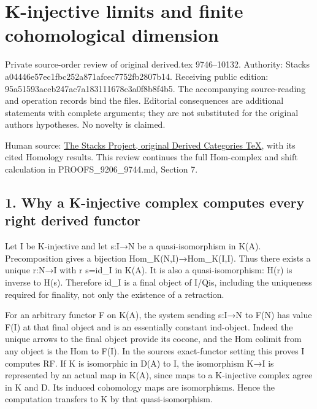 \section{K-injective limits and finite cohomological dimension}\label{proofs-9746-10132-k-injective-limits-and-finite-cohomological-dimension}

Private source-order review of original derived.tex 9746–\allowbreak{}10132. Authority:\allowbreak{} Stacks a04446e5\allowbreak{}7ec1fbc2\allowbreak{}52a871af\allowbreak{}cec7752f\allowbreak{}b2807b14. Receiving public edition:\allowbreak{} 95a51593\allowbreak{}aceb247a\allowbreak{}c7a18311\allowbreak{}1678c3a0\allowbreak{}f8b8f4b5. The accompanying source-reading and operation records bind the files. Editorial consequences are additional statements with complete arguments; they are not substituted for the original author\textquotesingle s hypotheses. No novelty is claimed.

Human source:\allowbreak{} \href{https://github.com/stacks/stacks-project/blob/a04446e57ec1fbc252a871afcec7752fb2807b14/derived.tex\#L9746}{The Stacks Project,\allowbreak{} original Derived Categories TeX},\allowbreak{} with its cited Homology results. This review continues the full Hom-complex and shift calculation in PROOFS\_\allowbreak{}9206\_\allowbreak{}9744.md,\allowbreak{} Section 7.

\subsection{1. Why a K-injective complex computes every right derived functor}\label{proofs-9746-10132-why-a-k-injective-complex-computes-every-right-derived-functor}

Let I be K-injective and let s:\allowbreak{}I\allowbreak{}→N be a quasi-isomorphism in K(A)\allowbreak{}. Precomposition gives a bijection Hom\_\allowbreak{}K(N,\allowbreak{}I)\allowbreak{}\allowbreak{}→Hom\_\allowbreak{}K(I,\allowbreak{}I)\allowbreak{}. Thus there exists a unique r:\allowbreak{}N\allowbreak{}→I with r s\allowbreak{}=id\_\allowbreak{}I in K(A)\allowbreak{}. It is also a quasi-isomorphism:\allowbreak{} H(r)\allowbreak{} is inverse to H(s)\allowbreak{}. Therefore id\_\allowbreak{}I is a final object of I/\allowbreak{}Qis,\allowbreak{} including the uniqueness required for finality,\allowbreak{} not only the existence of a retraction.

For an arbitrary functor F on K(A)\allowbreak{},\allowbreak{} the system sending s:\allowbreak{}I\allowbreak{}→N to F(N)\allowbreak{} has value F(I)\allowbreak{} at that final object and is an essentially constant ind-object. Indeed the unique arrows to the final object provide its cocone,\allowbreak{} and the Hom colimit from any object is the Hom to F(I)\allowbreak{}. In the source\textquotesingle s exact-functor setting this proves I computes RF. If K is isomorphic in D(A)\allowbreak{} to I,\allowbreak{} the isomorphism K\allowbreak{}→I is represented by an actual map in K(A)\allowbreak{},\allowbreak{} since maps to a K-injective complex agree in K and D. Its induced cohomology maps are isomorphisms. Hence the computation transfers to K by that quasi-isomorphism.

